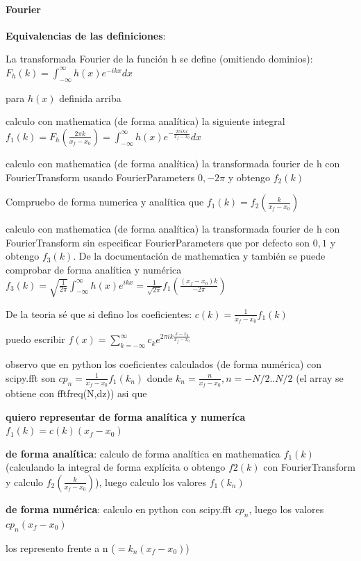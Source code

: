 \documentclass{article}
\begin{document}
\paragraph{Fourier}
\textbf{Equivalencias de las definiciones}:

\begin{description}
\item La transformada Fourier de la función h se define  (omitiendo dominios):
$F_h(k) = \int_{- \infty}^{\infty}{h(x) e^{-i k x} dx } $
 
\item para $h(x)$ definida arriba

\item calculo con mathematica (de forma analítica) la siguiente integral
$f_1(k)=F_h(\frac{2\pi k}{x_f - x_0} ) = \int_{- \infty}^{\infty}{h(x) e^{-\frac{2 \pi i k x }{x_f - x_0}} dx } $

\item calculo con mathematica (de forma analítica) la transformada fourier de h con FourierTransform usando FourierParameters $0, -2\pi$  y obtengo $f_2(k)$
\item Compruebo de forma numerica y analítica que
$f_1(k) = f_2(\frac{k}{x_f - x_0})$

\item \color{red}calculo con mathematica (de forma analítica) la transformada fourier de h con FourierTransform sin especificar FourierParameters que por defecto son  $0, 1$  y obtengo $f_3(k)$. De la documentación de mathematica y también se puede comprobar de forma analítica y numérica $f_3(k) = \sqrt{\frac{1}{2 \pi}} \int_{- \infty}^{\infty}{h(x) e^{i k x}} = \frac{1}{\sqrt{2 \pi}} f_1(\frac{(x_f - x_0)k}{-2 \pi})$ 
\color{black}

\item De la teoria sé que si defino los coeficientes: $c(k) = \frac{1}{x_f - x_0} f_1(k) $
\item  puedo escribir $f(x) = \sum_{k=-\infty}^{\infty} c_k e^{2 \pi i k \frac{x-x_0}{x_f - x_0}}$
\item observo que en python los coeficientes calculados (de forma numérica) con scipy.fft son  \color{red} $cp_n =\frac{1}{x_f - x_0}  f_1(k_n)$ 
donde $k_n = \frac{n}{x_f - x_0}, n = -N/2..N/2$ (el array se obtiene con fftfreq(N,dz))
 \color{black} asi que 

\item \textbf{quiero representar de forma analítica y numeríca} $f_1(k) = c(k)  (x_f-x_0)$
\item \textbf{de forma analítica}: \color{red} calculo de forma analítica en mathematica $f_1(k)$ (calculando la integral de forma explícita o  obtengo $f2(k)$ con FourierTransform y calculo  $f_2(\frac{k}{x_f - x_0})$), luego calculo los valores $f_1(k_n)$
\item \textbf{de forma numérica}: calculo en python con scipy.fft $cp_n$, luego los valores $cp_n  (x_f - x_0)$  
\item los represento frente a n ($=k_n (x_f - x_0)$)


\end{description}
\end{document}
